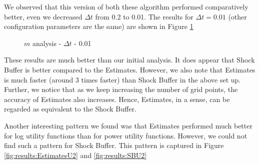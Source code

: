 We observed that this version of both these algorithm performed comparatively better, even we decreased $\Delta t$ from 0.2 to 0.01. The results for $\Delta t = 0.01$ (other configuration parameters are the same) are shown in Figure \ref{fig:results:ML}


\begin{figure}[!tbp]
  \vfill
  
  \caption{ $m$ analysis - $\Delta t$ - 0.01}
  \label{fig:results:ML}
\end{figure}

These results are much better than our initial analysis. It does appear that Shock Buffer is better compared to the Estimates. However, we also note that Estimates is much faster (around 3 times faster) than Shock Buffer in the above set up.  Further, we notice that as we keep increasing the number of grid points, the accuracy of Estimates also increases. Hence, Estimates, in a sense, can be regarded as equivalent to the Shock Buffer. 

Another interesting pattern we found was that Estimates performed much better for log utility functions than for power utility functions. However, we could not find such a pattern for  Shock Buffer. This pattern is captured in Figure \ref{fig:results:EstimatesU2} and \ref{fig:results:SBU2}

